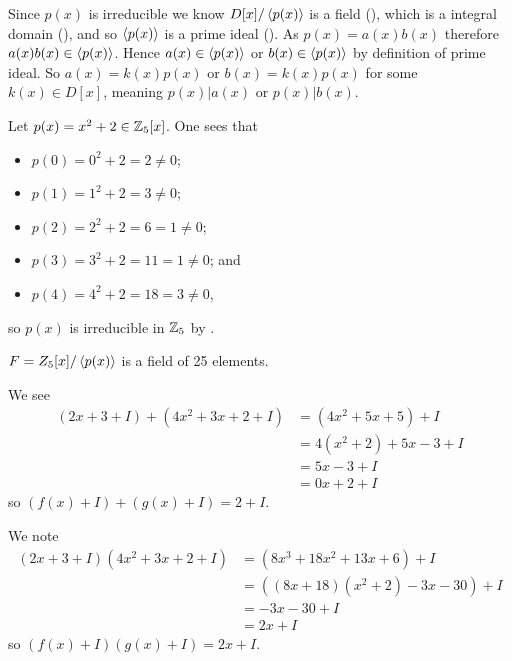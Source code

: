 \begin{questions}
    \item Since $p(x)$ is irreducible we know $D[x]/\left\langle p(x)\right\rangle$ is a field (), which is a integral domain (), and so $\left\langle p(x)\right\rangle$ is a prime ideal (). As $p(x) = a(x)b(x)$ therefore $a(x)b(x) \in \left\langle p(x)\right\rangle$. Hence $a(x) \in \left\langle p(x)\right\rangle$ or $b(x) \in \left\langle p(x)\right\rangle$ by definition of prime ideal. So $a(x) = k(x)p(x)$ or $b(x) = k(x)p(x)$ for some $k(x) \in D[x]$, meaning $p(x) \vert a(x)$ or $p(x) \vert b(x)$.

    \item \begin{partquestions}{\roman*}
        \item Let $p(x) = x^2 + 2 \in \mathbb{Z}_5[x]$. One sees that
        \begin{itemize}
            \item $p(0) = 0^2 + 2 = 2 \neq 0$;
            \item $p(1) = 1^2 + 2 = 3 \neq 0$;
            \item $p(2) = 2^2 + 2 = 6 = 1 \neq 0$;
            \item $p(3) = 3^2 + 2 = 11 = 1 \neq 0$; and
            \item $p(4) = 4^2 + 2 = 18 = 3 \neq 0$,
        \end{itemize}
        so $p(x)$ is irreducible in $\mathbb{Z}_5$ by .

        \item $F = Z_5[x]/\left\langle p(x)\right\rangle$ is a field of 25 elements.

        \item \begin{partquestions}{\alph*}
            \item We see
            \begin{align*}
                \left(2x+3 + I\right) + \left(4x^2+3x+2 + I\right) &= (4x^2+5x+5) + I\\
                &= 4(x^2+2) + 5x - 3 + I\\
                &= 5x - 3 + I\\
                &= 0x + 2 + I
            \end{align*}
            so $(f(x) + I) + (g(x) + I) = 2 + I$.

            \item We note
            \begin{align*}
                (2x+3 + I)(4x^2+3x+2 + I) &= (8 x^3 + 18 x^2 + 13 x + 6) + I\\
                &= \left((8x + 18)(x^2+2) - 3x - 30\right) + I\\
                &= -3x - 30 + I\\
                &= 2x + I
            \end{align*}
            so $(f(x) + I)(g(x) + I) = 2x + I$.
        \end{partquestions}
    \end{partquestions}


\end{questions}

